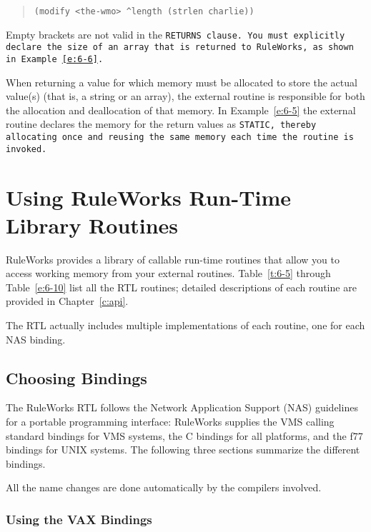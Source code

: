 \begin{quote}
\begin{verbatim}
(modify <the-wmo> ^length (strlen charlie))
\end{verbatim}
\end{quote}

Empty brackets are not valid in the \tt{RETURNS} clause. You must
explicitly declare the size of an array that is returned to RuleWorks,
as shown in Example~\ref{e:6-6}.

When returning a value for which memory must be allocated to store the
actual value(s) (that is, a string or an array), the external routine
is responsible for both the allocation and deallocation of that
memory. In Example~\ref{e:6-5} the external routine declares the memory for
the return values as \tt{STATIC}, thereby allocating once and reusing
the same memory each time the routine is invoked.

\section{Using RuleWorks Run-Time Library Routines}

RuleWorks provides a library of callable run-time routines that allow
you to access working memory from your external
routines. Table~\ref{t:6-5} through Table~\ref{e:6-10} list all the
RTL routines; detailed descriptions of each routine are provided in
Chapter~\ref{c:api}.

The RTL actually includes multiple implementations of each routine,
one for each NAS binding.

\subsection{Choosing Bindings}

The RuleWorks RTL follows the Network Application Support (NAS)
guidelines for a portable programming interface: RuleWorks supplies
the VMS calling standard bindings for VMS systems, the C bindings for
all platforms, and the f77 bindings for UNIX systems. The following
three sections summarize the different bindings.

\begin{note}
  All the name changes are done automatically by the compilers
  involved.
\end{note}

\subsubsection{Using the VAX Bindings}

